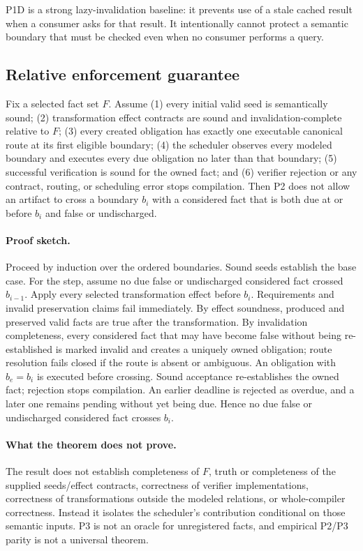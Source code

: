 P1D is a strong lazy-invalidation baseline: it prevents use of a stale cached result when a consumer asks for that result. It intentionally cannot protect a semantic boundary that must be checked even when no consumer performs a query.

\subsection{Relative enforcement guarantee}
\begin{theorem}
Fix a selected fact set $F$. Assume (1) every initial valid seed is semantically sound; (2) transformation effect contracts are sound and invalidation-complete relative to $F$; (3) every created obligation has exactly one executable canonical route at its first eligible boundary; (4) the scheduler observes every modeled boundary and executes every due obligation no later than that boundary; (5) successful verification is sound for the owned fact; and (6) verifier rejection or any contract, routing, or scheduling error stops compilation. Then P2 does not allow an artifact to cross a boundary $b_i$ with a considered fact that is both due at or before $b_i$ and false or undischarged.
\end{theorem}

\paragraph{Proof sketch.}
Proceed by induction over the ordered boundaries. Sound seeds establish the base case. For the step, assume no due false or undischarged considered fact crossed $b_{i-1}$. Apply every selected transformation effect before $b_i$. Requirements and invalid preservation claims fail immediately. By effect soundness, produced and preserved valid facts are true after the transformation. By invalidation completeness, every considered fact that may have become false without being re-established is marked invalid and creates a uniquely owned obligation; route resolution fails closed if the route is absent or ambiguous. An obligation with $b_e=b_i$ is executed before crossing. Sound acceptance re-establishes the owned fact; rejection stops compilation. An earlier deadline is rejected as overdue, and a later one remains pending without yet being due. Hence no due false or undischarged considered fact crosses $b_i$.

\paragraph{What the theorem does not prove.}
The result does not establish completeness of $F$, truth or completeness of the supplied seeds/effect contracts, correctness of verifier implementations, correctness of transformations outside the modeled relations, or whole-compiler correctness. Instead it isolates the scheduler's contribution conditional on those semantic inputs. P3 is not an oracle for unregistered facts, and empirical P2/P3 parity is not a universal theorem.
